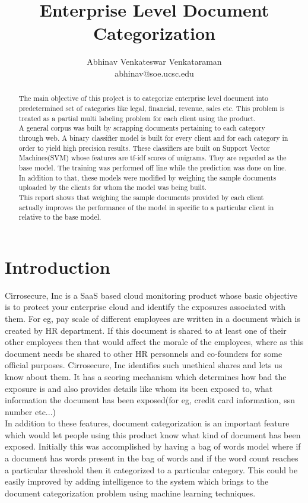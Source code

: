 \documentclass[11pt]{article}
\title{Enterprise Level Document Categorization}
\author{Abhinav Venkateswar Venkataraman \\ abhinav@soe.ucsc.edu}
\begin{document}
\maketitle
\begin{abstract}
	The main objective of this project is to categorize enterprise level document into predetermined set of categories like legal, financial, revenue, sales etc.  This problem is treated as a partial multi labeling problem for each client using the product. \\
	
	A general corpus was  built by scrapping documents pertaining to each category through web. A binary classifier model is built for every client and for each category in order to yield high precision results.  These classifiers are built on Support Vector Machines(SVM) whose features are tf-idf scores of unigrams.  They are regarded as the base model. The training was performed off line while the prediction was done on line. In addition to that, these models were modified by weighing the sample documents uploaded by the clients for whom the model was being built. \\
	
	This report shows that weighing the sample documents provided by each client actually improves the performance of the model in specific to a particular client in relative to the base model. 
\end{abstract}
\section{Introduction}
Cirrosecure, Inc is a SaaS based cloud monitoring product  whose basic objective is to protect your enterprise cloud and identify the exposures associated with them. For eg,  pay scale of different employees are written in a document which is created by HR department. If this document is shared to at least one of their other employees then that would affect the morale of the employees, where as this document needs be shared to other HR personnels and co-founders for some official purposes. Cirrosecure, Inc identifies such unethical shares and lets us know about them. It has a scoring mechanism which determines how bad the exposure is and also provides details like whom its been exposed to, what information the document has been exposed(for eg, credit card information, ssn number etc...) \\

In addition to these features, document categorization is an important feature which would let people using this product know what kind of document has been exposed. Initially this was accomplished by having a bag of words model where if a document has words present in the bag of words and if the word count reaches a particular threshold then it categorized to a particular category. This could be easily improved by adding intelligence to the system which brings to the document categorization problem using machine learning techniques. \\
\end{document}
